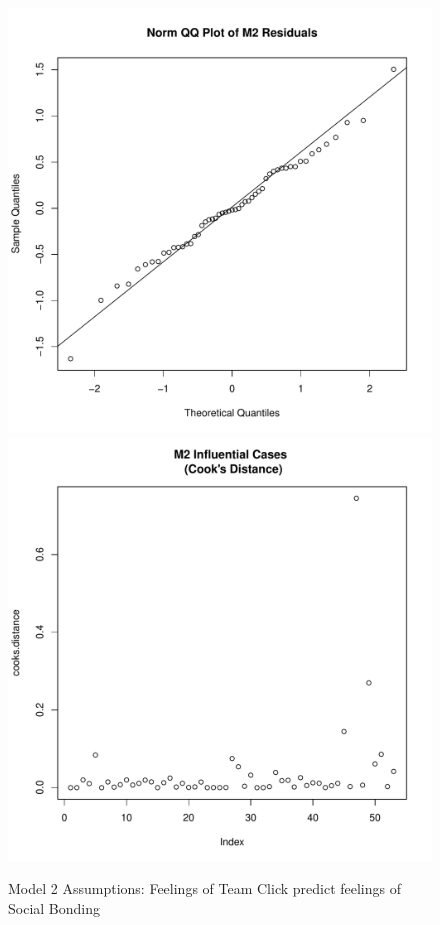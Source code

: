 \begin{figure}[htbp]
    \includegraphics[scale =.4]{images/TEM2QQNorm.pdf}
    \includegraphics[scale =.4]{images/TEM2CooksD.pdf}
    \caption{Model 2 Assumptions: Feelings of Team Click predict feelings of Social Bonding}
    \label{fig:M2Assumptions}
\end{figure}


